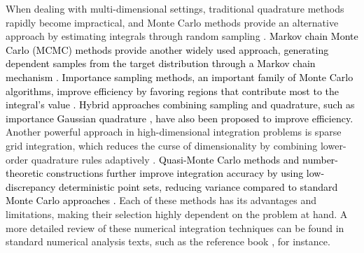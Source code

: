 \documentclass[review]{elsarticle}
\newcommand{\cblue}{\textcolor{black}}
\begin{document}
When dealing with multi-dimensional settings, traditional quadrature methods rapidly become impractical, and Monte Carlo methods provide an alternative approach by estimating integrals through random sampling \cite{Robert04,mcbook,liu2001monte}. 
%
\cblue{Markov chain Monte Carlo (MCMC) methods provide another widely used approach, generating dependent samples from the target distribution through a Markov chain mechanism \cite{Robert04}.}
%
\cblue{Importance sampling methods, an important family of Monte Carlo algorithms, improve efficiency by favoring regions that contribute most to the integral's value \cite{Robert04,elvira2021advances}. Hybrid approaches combining sampling and quadrature, such as importance Gaussian quadrature \cite{elvira2020importance}, have also been proposed to improve efficiency.}
%
Another powerful approach in high-dimensional integration problems is sparse grid integration, which reduces the curse of dimensionality by combining lower-order quadrature rules adaptively \cite{NovakRitter1996}. \cblue{Quasi-Monte Carlo methods and number-theoretic constructions further improve integration accuracy by using low-discrepancy deterministic point sets, reducing variance compared to standard Monte Carlo approaches \cite{caflisch1998monte,naor2004number}.} Each of these methods has its advantages and limitations, making their selection highly dependent on the problem at hand. A more detailed review of these numerical integration techniques can be found in standard numerical analysis texts, such as the reference book \cite{EvansSwartz2000}, for instance.
\end{document}
